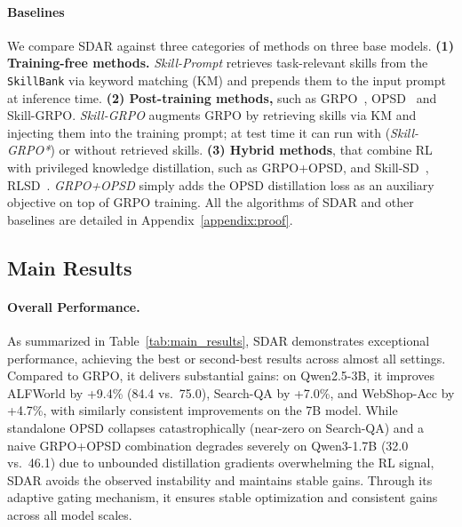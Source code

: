 \documentclass{article} %
\newcommand{\methodname}{\textsc{SDAR}\xspace}
\begin{document}
\paragraph{Baselines}
We compare \methodname{} against three categories of methods on three base models.
  \textbf{(1) Training-free methods.}
  \textit{Skill-Prompt} retrieves task-relevant skills from the \texttt{SkillBank} via keyword
  matching (KM) and prepends them to the input prompt at inference time.
  \textbf{(2) Post-training methods,} such as GRPO~\citep{shao2024deepseekmath}, OPSD~\citep{zhao2026opsd} and Skill-GRPO. \textit{Skill-GRPO} augments GRPO by retrieving skills via KM and injecting them into the
  training prompt;
  at test time it can run with (\textit{Skill-GRPO*}) or without retrieved skills.
  \textbf{(3) Hybrid methods}, that combine RL with privileged knowledge distillation, such as GRPO+OPSD, and Skill-SD~\citep{wang2026skillsd}, RLSD~\citep{yang2026rlsd}.  
  \textit{GRPO+OPSD} simply adds the OPSD distillation loss as an auxiliary objective on top of GRPO training. All the algorithms of \methodname{} and other baselines are detailed in Appendix~\ref{appendix:proof}.
\subsection{Main Results}
\paragraph{Overall Performance.}          
As summarized in Table~\ref{tab:main_results}, \methodname{} demonstrates exceptional performance, achieving the best or second-best results across almost all settings. Compared to GRPO, it delivers substantial gains: on Qwen2.5-3B, it improves ALFWorld by +9.4\% (84.4 vs.\ 75.0), Search-QA by +7.0\%, and WebShop-Acc by +4.7\%, with similarly consistent improvements on the 7B model. While standalone OPSD collapses catastrophically (near-zero on Search-QA) and a naive GRPO+OPSD combination degrades severely on Qwen3-1.7B (32.0 vs.\ 46.1) due to unbounded distillation gradients overwhelming the RL signal, \methodname{} avoids the observed instability and maintains stable gains. Through its adaptive gating mechanism, it ensures stable optimization and consistent gains across all model scales.
 
\end{document}
